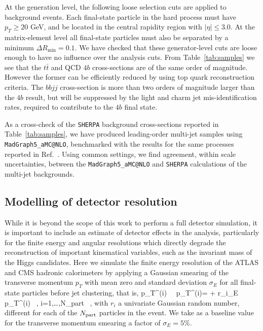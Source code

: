 At the generation level, the following loose selection 
cuts are applied to
background events.
%
Each final-state particle in the hard process must have $p_T \ge 20$ GeV, and be located
in the central  rapidity
region with
$| \eta | \le 3.0$.
%
At the matrix-element level
all final-state particles must also be separated by a minimum $\Delta R_{\mathrm{min}} =0.1$.
%
We have checked that these generator-level cuts are loose enough to have
no influence over the analysis cuts.
%
From Table~\ref{tab:samples}
we see that the $t\bar{t}$ and QCD $4b$ cross-sections are of
the same order of magnitude. However the former can be efficiently
reduced by using top quark reconstruction criteria.
%
The $bbjj$ cross-section is more than two orders
of magnitude larger than the $4b$ result, but will be suppressed
by the light and charm jet mis-identification rates,
required to contribute to the $4b$ final state.

As a cross-check of the {\tt SHERPA}
background cross-sections reported in Table~\ref{tab:samples}, we have produced leading-order
multi-jet samples
using {\tt MadGraph5\_aMC@NLO},
benchmarked with the results for the same processes reported in
Ref.~\cite{Alwall:2014hca}.
%
Using common settings, we find
agreement, within scale uncertainties,  between the
{\tt MadGraph5\_aMC@NLO} and {\tt SHERPA} calculations of
the multi-jet backgrounds.

\subsection{Modelling of detector resolution}
\label{sec:detectormodeling}

While it is beyond the scope of this work to perform a full
detector simulation, it is important to include an estimate of detector
effects in the analysis, particularly for the finite energy
and angular resolutions which directly
degrade the reconstruction of important kinematical variables, such as
the invariant mass of the Higgs candidates.
%
Here we simulate the finite energy resolution of the ATLAS and CMS
hadronic calorimeters by applying a Gaussian smearing of the transverse
momentum $p_T$ with mean zero and standard deviation $\sigma_E$ for all
final-state particles before jet clustering, that is,
%
\be
\label{eq:smearing}
p_T^{(i)} \, \to \, p_T^{(i)\prime}= + r_i\cdot\sigma_E \rp\, p_T^{(i)} \, , \quad
i=1,\ldots,N_{\rm part} \, ,
\ee
with $r_i$ a univariate Gaussian random number, different for each
of the $N_{\rm part}$ particles in the event.
%
We take as a baseline value for the transverse momentum smearing a
factor of $\sigma_E=5\%$.
%


